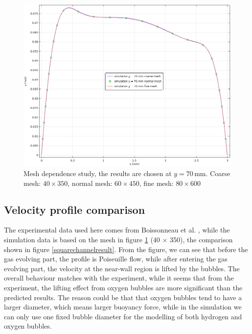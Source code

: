 \begin{figure}[H]
    \centering
    \includegraphics[width=1\textwidth]{meshstudy.png}
    \caption{Mesh dependence study, the results are chosen at $y = 70 \, \mathrm{ mm }$. Coarse mesh: $40 \times 350$, normal mesh: $60 \times 450$, fine mesh: $80 \times 600$}
    \label{meshstudy}
\end{figure}

\subsection{Velocity profile comparison}

The experimental data used here comes from Boissonneau et al. \cite{Boissonneau2000}, while the simulation data is based on the mesh in figure \ref{meshstudy} (40 $ \times$ 350), the comparison shown in figure \ref{squarechannelresult}. From the figure, we can see that before the gas evolving part, the profile is Poiseuille flow, while after entering the gas evolving part, the velocity at the near-wall region is lifted by the bubbles. The overall behaviour matches with the experiment, while it seems that from the experiment, the lifting effect from oxygen bubbles are more significant than the predicted results. The reason could be that that oxygen bubbles tend to have a larger diameter, which means larger buoyancy force, while in the simulation we can only use one fixed bubble diameter for the modelling of both hydrogen and oxygen bubbles. 

